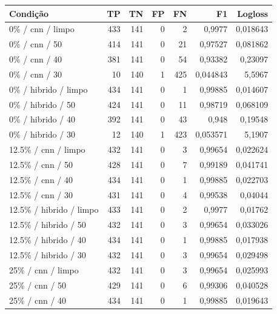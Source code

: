 \small\begin{longtable}{@{}p{.38\linewidth}rrrrrr@{}}
\toprule Condição & TP & TN & FP & FN & F1 & Logloss\\\midrule\endhead
0\% /\allowbreak{} cnn /\allowbreak{} limpo & 433 & 141 & 0 & 2 & 0,9977 & 0,018643\\
0\% /\allowbreak{} cnn /\allowbreak{} 50 & 414 & 141 & 0 & 21 & 0,97527 & 0,081862\\
0\% /\allowbreak{} cnn /\allowbreak{} 40 & 381 & 141 & 0 & 54 & 0,93382 & 0,23097\\
0\% /\allowbreak{} cnn /\allowbreak{} 30 & 10 & 140 & 1 & 425 & 0,044843 & 5,5967\\
0\% /\allowbreak{} hibrido /\allowbreak{} limpo & 434 & 141 & 0 & 1 & 0,99885 & 0,014607\\
0\% /\allowbreak{} hibrido /\allowbreak{} 50 & 424 & 141 & 0 & 11 & 0,98719 & 0,068109\\
0\% /\allowbreak{} hibrido /\allowbreak{} 40 & 392 & 141 & 0 & 43 & 0,948 & 0,19548\\
0\% /\allowbreak{} hibrido /\allowbreak{} 30 & 12 & 140 & 1 & 423 & 0,053571 & 5,1907\\
12.5\% /\allowbreak{} cnn /\allowbreak{} limpo & 432 & 141 & 0 & 3 & 0,99654 & 0,022624\\
12.5\% /\allowbreak{} cnn /\allowbreak{} 50 & 428 & 141 & 0 & 7 & 0,99189 & 0,041741\\
12.5\% /\allowbreak{} cnn /\allowbreak{} 40 & 434 & 141 & 0 & 1 & 0,99885 & 0,022703\\
12.5\% /\allowbreak{} cnn /\allowbreak{} 30 & 431 & 141 & 0 & 4 & 0,99538 & 0,04044\\
12.5\% /\allowbreak{} hibrido /\allowbreak{} limpo & 433 & 141 & 0 & 2 & 0,9977 & 0,01762\\
12.5\% /\allowbreak{} hibrido /\allowbreak{} 50 & 432 & 141 & 0 & 3 & 0,99654 & 0,033026\\
12.5\% /\allowbreak{} hibrido /\allowbreak{} 40 & 434 & 141 & 0 & 1 & 0,99885 & 0,017938\\
12.5\% /\allowbreak{} hibrido /\allowbreak{} 30 & 432 & 141 & 0 & 3 & 0,99654 & 0,029498\\
25\% /\allowbreak{} cnn /\allowbreak{} limpo & 432 & 141 & 0 & 3 & 0,99654 & 0,025993\\
25\% /\allowbreak{} cnn /\allowbreak{} 50 & 429 & 141 & 0 & 6 & 0,99306 & 0,040528\\
25\% /\allowbreak{} cnn /\allowbreak{} 40 & 434 & 141 & 0 & 1 & 0,99885 & 0,019643\\

\end{longtable}
